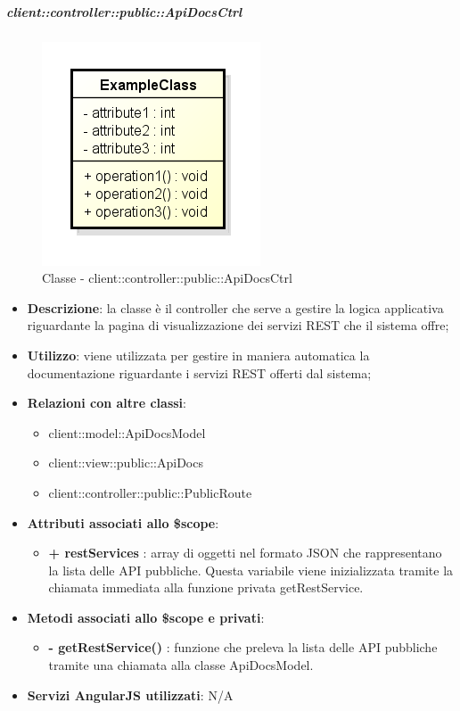 		\subparagraph{client::controller::public::ApiDocsCtrl} %
		\label{subp:bdsm_app_client_controller_public_apidocsctrl}
			\begin{figure}[htbp]
				\centering
				\centerline{\includegraphics[scale=0.7]{./images/client/classes/example_class.png}}
				\caption{Classe - client::controller::public::ApiDocsCtrl}
			\end{figure}
		\begin{itemize}
			\item \textbf{Descrizione}: la classe è il controller che serve a gestire la logica applicativa riguardante la pagina di visualizzazione dei servizi REST che il sistema offre;
			\item \textbf{Utilizzo}: viene utilizzata per gestire in maniera automatica la documentazione riguardante i servizi REST offerti dal sistema;
			\item \textbf{Relazioni con altre classi}:
				\begin{itemize}
					\item client::model::ApiDocsModel
					\item client::view::public::ApiDocs
					\item client::controller::public::PublicRoute
				\end{itemize}

			\item \textbf{Attributi associati allo \$scope}:
				\begin{itemize}
					\item \textbf{+ restServices} : array di oggetti nel formato JSON che rappresentano la lista delle API pubbliche. Questa variabile viene inizializzata tramite la chiamata immediata alla funzione privata getRestService.
				\end{itemize}

			\item \textbf{Metodi associati allo \$scope e privati}:
				\begin{itemize}
					\item \textbf{- getRestService()} : funzione che preleva la lista delle API pubbliche tramite una chiamata alla classe ApiDocsModel.
				\end{itemize}

			\item \textbf{Servizi AngularJS utilizzati}: N/A

		\end{itemize}


